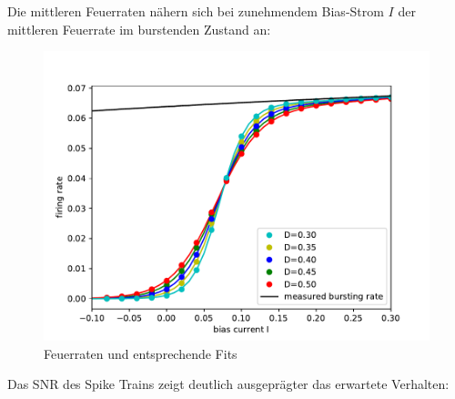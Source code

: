 \documentclass[12pt,a4paper]{article}
\begin{document}
Die mittleren Feuerraten nähern sich bei zunehmendem Bias-Strom $I$ der mittleren Feuerrate im burstenden Zustand an:
\begin{figure}[H]
	\centering
	\includegraphics[scale=0.9]{ganaburst.pdf}
	\caption{Feuerraten und entsprechende Fits}
	\label{feuerrate}
\end{figure}

Das SNR des Spike Trains zeigt deutlich ausgeprägter das erwartete Verhalten:
\end{document}
